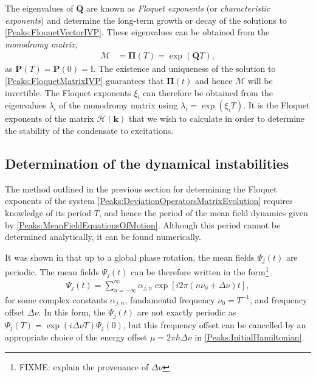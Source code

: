 The eigenvalues of $\bm{Q}$ are known as \emph{Floquet exponents} (or \emph{characteristic exponents}) and determine the long-term growth or decay of the solutions to \eqref{Peaks:FloquetVectorIVP}. These eigenvalues can be obtained from the \emph{monodromy matrix},
\begin{align}
    \label{Peaks:MonodromyMatrix}
    \mathcal{M} &= \bm{\Pi}(T) = \exp(\bm{Q} T),
\end{align}
as $\bm{P}(T) = \bm{P}(0) = \mathbb{I}$. The existence and uniqueness of the solution to \eqref{Peaks:FloquetMatrixIVP} guarantees that $\bm{\Pi}(t)$ and hence $\mathcal{M}$ will be invertible. The Floquet exponents $\xi_i$ can therefore be obtained from the eigenvalues $\lambda_i$ of the monodromy matrix using $\lambda_i = \exp(\xi_i T)$. It is the Floquet exponents of the matrix $\mathcal{H}(\bm{k})$ that we wish to calculate in order to determine the stability of the condensate to excitations.

\subsection{Determination of the dynamical instabilities}
\label{Peaks:ExperimentEigenvalues}

The method outlined in the previous section for determining the Floquet exponents of the system \eqref{Peaks:DeviationOperatorsMatrixEvolution} requires knowledge of its period $T$, and hence the period of the mean field dynamics given by \eqref{Peaks:MeanFieldEquationsOfMotion}. Although this period cannot be determined analytically, it can be found numerically.

It was shown in  that up to a global phase rotation, the mean fields $\Psi_j(t)$ are periodic. The mean fields $\Psi_j(t)$ can be therefore written in the form\footnote{FIXME: explain the provenance of $\Delta \nu$}
\begin{align}
    \label{Peaks:MeanFieldFourierDecomposition}
    \Psi_j(t) = \sum_{n=-\infty}^\infty \alpha_{j,n} \exp\left[i 2\pi \left( n \nu_0 + \Delta\nu\right)t \right],
\end{align}
for some complex constants $\alpha_{j, n}$, fundamental frequency $\nu_0 = T^{-1}$, and frequency offset $\Delta \nu$. In this form, the $\Psi_j(t)$ are not exactly periodic as $\Psi_j(T) = \exp(i\Delta \nu T)\Psi_j(0)$, but this frequency offset can be cancelled by an appropriate choice of the energy offset $\mu = 2\pi\hbar \Delta \nu$ in \eqref{Peaks:InitialHamiltonian}.

